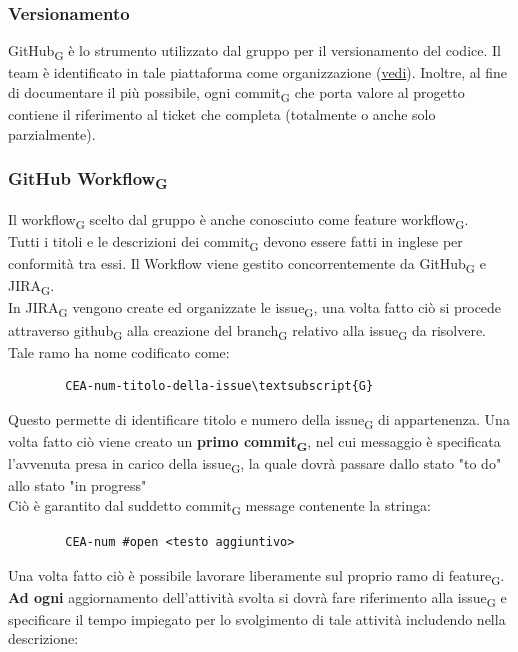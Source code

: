 	\subsubsection{Versionamento}
	GitHub\textsubscript{G} è lo strumento utilizzato dal gruppo per il versionamento del codice.
	\newline Il team è identificato in tale piattaforma come organizzazione (\href{https://github.com/catchEmAll-SWE}{vedi}).
	Inoltre, al fine di documentare il più possibile, ogni commit\textsubscript{G} che porta valore al progetto contiene il riferimento al ticket che completa (totalmente o anche solo parzialmente). 

	\subsubsection{GitHub Workflow\textsubscript{G}}
	Il workflow\textsubscript{G} scelto dal gruppo è anche conosciuto come feature workflow\textsubscript{G}.\\
	Tutti i titoli e le descrizioni dei commit\textsubscript{G} devono essere fatti in inglese per conformità tra essi.
	\newline Il Workflow viene gestito concorrentemente da GitHub\textsubscript{G} e JIRA\textsubscript{G}. \\
In JIRA\textsubscript{G} vengono create ed organizzate le issue\textsubscript{G}, una volta fatto ciò si procede attraverso github\textsubscript{G} alla creazione del branch\textsubscript{G} relativo alla issue\textsubscript{G} da risolvere.\\
	Tale ramo ha nome codificato come:
	\begin{lstlisting}
		CEA-num-titolo-della-issue\textsubscript{G}
	\end{lstlisting}
	Questo permette di identificare titolo e numero della issue\textsubscript{G} di appartenenza. Una volta fatto ciò viene creato un \textbf{primo commit\textsubscript{G}}, nel cui messaggio è specificata l'avvenuta presa in carico della issue\textsubscript{G}, la quale dovrà passare dallo stato "to do" allo stato "in progress"\\
	Ciò è garantito dal suddetto commit\textsubscript{G} message contenente la stringa:
	\begin{lstlisting}
		CEA-num #open <testo aggiuntivo>
	\end{lstlisting}
	Una volta fatto ciò è possibile lavorare liberamente sul proprio ramo di feature\textsubscript{G}.
	\newline \textbf{Ad ogni} aggiornamento dell'attività svolta si dovrà fare riferimento alla issue\textsubscript{G} e specificare il tempo impiegato per lo svolgimento di tale attività includendo nella descrizione:
